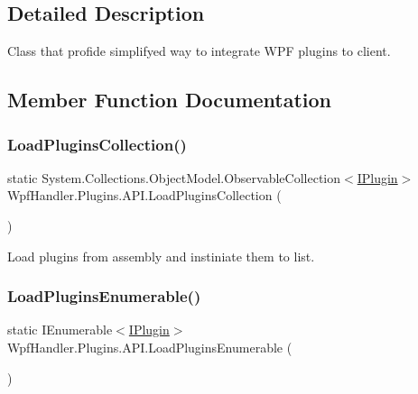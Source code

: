 \subsection{Detailed Description}
Class that profide simplifyed way to integrate W\+PF plugins to client. 



\subsection{Member Function Documentation}
\mbox{\label{class_wpf_handler_1_1_plugins_1_1_a_p_i_aa797a592049cf57860ee422586fcccac}} 
\subsubsection{\texorpdfstring{Load\+Plugins\+Collection()}{LoadPluginsCollection()}}
{\footnotesize\ttfamily static System.\+Collections.\+Object\+Model.\+Observable\+Collection$<$\mbox{\hyperlink{interface_wpf_handler_1_1_plugins_1_1_i_plugin}{I\+Plugin}}$>$ Wpf\+Handler.\+Plugins.\+A\+P\+I.\+Load\+Plugins\+Collection (\begin{DoxyParamCaption}{ }\end{DoxyParamCaption})\hspace{0.3cm}{\ttfamily [static]}}



Load plugins from assembly and instiniate them to list. 

\mbox{\label{class_wpf_handler_1_1_plugins_1_1_a_p_i_ae2d2c46617f63533ddc20f08166b6c6e}} 
\subsubsection{\texorpdfstring{Load\+Plugins\+Enumerable()}{LoadPluginsEnumerable()}}
{\footnotesize\ttfamily static I\+Enumerable$<$\mbox{\hyperlink{interface_wpf_handler_1_1_plugins_1_1_i_plugin}{I\+Plugin}}$>$ Wpf\+Handler.\+Plugins.\+A\+P\+I.\+Load\+Plugins\+Enumerable (\begin{DoxyParamCaption}{ }\end{DoxyParamCaption})\hspace{0.3cm}{\ttfamily [static]}}



